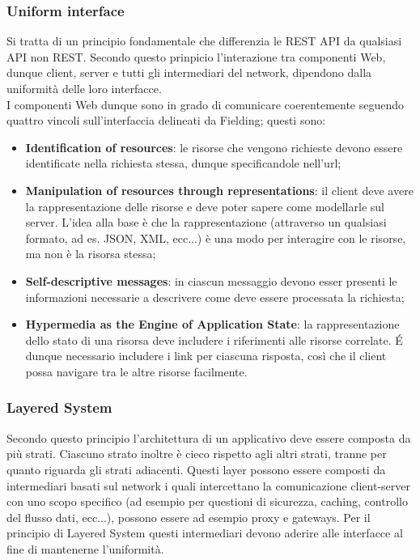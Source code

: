 \subsubsection*{Uniform interface}
Si tratta di un principio fondamentale che differenzia le REST API da qualsiasi API non REST. Secondo questo prinpicio l'interazione tra componenti Web, dunque client, server e tutti gli intermediari del network, dipendono dalla uniformità delle loro interfacce.\\
I componenti Web dunque sono in grado di comunicare coerentemente seguendo quattro vincoli sull'interfaccia delineati da Fielding; questi sono:
\begin{itemize}
  \item \textbf{Identification of resources}: le risorse che vengono richieste devono essere identificate nella richiesta stessa, dunque specificandole nell'url;
  \item \textbf{Manipulation of resources through representations}: il client deve avere la rappresentazione delle risorse e deve poter sapere come modellarle sul server. L'idea alla base è che la rappresentazione (attraverso un qualsiasi formato, ad es. JSON, XML, ecc...) è una modo per interagire con le risorse, ma non è la risorsa stessa;
  \item \textbf{Self-descriptive messages}: in ciascun messaggio devono esser presenti le informazioni necessarie a descrivere come deve essere processata la richiesta;
  \item \textbf{Hypermedia as the Engine of Application State}: la rappresentazione dello stato di una risorsa deve includere i riferimenti alle risorse correlate. É dunque necessario includere i link per ciascuna risposta, così che il client possa navigare tra le altre risorse facilmente.
\end{itemize}
\subsubsection*{Layered System}
Secondo questo principio l'architettura di un applicativo deve essere composta da più strati. Ciascuno strato inoltre è cieco rispetto agli altri strati, tranne per quanto riguarda gli strati adiacenti. Questi layer possono essere composti da intermediari basati sul network i quali intercettano la comunicazione client-server con uno scopo specifico (ad esempio per questioni di sicurezza, caching, controllo del flusso dati, ecc...), possono essere ad esempio proxy e gateways. Per il principio di Layered System questi intermediari devono aderire alle interfacce al fine di mantenerne l'uniformità.
